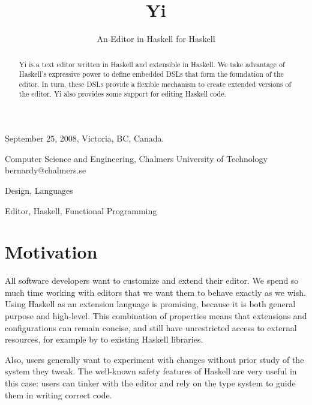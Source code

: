 \documentclass[9pt,indentedstyle]{sigplanconf}
\begin{document}
\authorpermission
{} {September 25, 2008, Victoria, BC, Canada.}


\title{Yi}
\subtitle{An Editor in Haskell for Haskell}
           {Computer Science and Engineering, 
            Chalmers University of Technology
          }
           {bernardy@chalmers.se}

\maketitle

\begin{abstract}
  Yi is a text editor written in Haskell and extensible in Haskell. We take
  advantage of Haskell's expressive power to define embedded DSLs that form the
  foundation of the editor. In turn, these DSLs provide a flexible
  mechanism to create extended versions of the editor. Yi also
  provides some support for editing Haskell code.
\end{abstract}


\terms
Design, Languages

\keywords
Editor, Haskell, Functional Programming

\section{Motivation}

All software developers want to customize and extend their editor. We
spend so much time working with editors that we want them to behave
exactly as we wish.  Using Haskell as an extension language is
promising, because it is both general purpose and high-level. This
combination of properties means that extensions and configurations can remain
concise, and still have unrestricted access to external resources, for
example by to existing Haskell libraries.

Also, users generally want to experiment with changes without prior
study of the system they tweak. The well-known safety features of
Haskell are very useful in this case: users can tinker with the editor
and rely on the type system to guide them in writing correct code.
\end{document}

